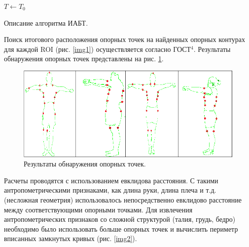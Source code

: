 \begin{algorithm}[ht!]
  $T\leftarrow T_0$\;
  \caption{Описание алгоритма ИАБТ.}
\end{algorithm}

Поиск итогового расположения опорных точек на найденных опорных контурах для каждой ROI (рис. \ref{img1}) осуществляется согласно ГОСТ$^4$. Результаты обнаружения опорных точек представлены на рис. \ref{img7}.
\begin{figure}[ht!]
\centering
\includegraphics [width=0.9\linewidth] {images/h18.png}
\begin{center}
\caption{Результаты обнаружения опорных точек.} \label{img7}
\end{center}
\end{figure}
Расчеты проводятся с использованием евклидова расстояния. С такими антропометрическими признаками, как длина руки, длина плеча и т.д. (несложная геометрия) использовалось непосредственно евклидово расстояние между соответствующими опорными точками. Для извлечения антропометрических признаков со сложной структурой (талия, грудь, бедро) необходимо было использовать больше опорных точек и вычислить периметр вписанных замкнутых кривых (рис. \ref{img2}).


